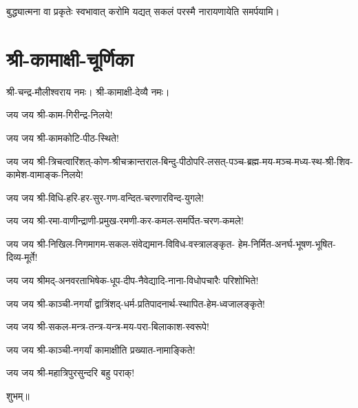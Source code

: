 {बुद्ध्यात्मना वा प्रकृतेः स्वभावात्}
{करोमि यद्यत् सकलं परस्मै}
{नारायणायेति समर्पयामि।}

\closesub


\section{श्री-कामाक्षी-चूर्णिका}

श्री-चन्द्र-मौलीश्वराय नमः। श्री-कामाक्षी-देव्यै नमः।

जय जय श्री-काम-गिरीन्द्र-निलये!

जय जय श्री-कामकोटि-पीठ-स्थिते!

जय जय श्री-त्रिचत्वारिंशत्-कोण-श्रीचक्रान्तराल-बिन्दु-पीठोपरि-लसत्-पञ्च-ब्रह्म-मय-मञ्च-मध्य-स्थ-श्री-शिव-कामेश-वामाङ्क-निलये!

जय जय श्री-विधि-हरि-हर-सुर-गण-वन्दित-चरणारविन्द-युगले!

जय जय श्री-रमा-वाणीन्द्राणी-प्रमुख-रमणी-कर-कमल-समर्पित-चरण-कमले!

जय जय श्री-निखिल-निगमागम-सकल-संवेद्यमान-विविध-वस्त्रालङ्कृत-
हेम-निर्मित-अनर्घ-भूषण-भूषित-दिव्य-मूर्ते!

जय जय श्रीमद्-अनवरताभिषेक-धूप-दीप-नैवेद्यादि-नाना-विधोपचारैः परिशोभिते!

जय जय श्री-काञ्ची-नगर्यां द्वात्रिंशद्-धर्म-प्रतिपादनार्थ-स्थापित-हेम-ध्वजालङ्कृते!

जय जय श्री-सकल-मन्त्र-तन्त्र-यन्त्र-मय-परा-बिलाकाश-स्वरूपे!

जय जय श्री-काञ्ची-नगर्यां कामाक्षीति प्रख्यात-नामाङ्किते!

जय जय श्री-महात्रिपुरसुन्दरि बहु पराक्!


\centerline{शुभम्॥}

\closesub
\begingroup

\endgroup
\closesection
